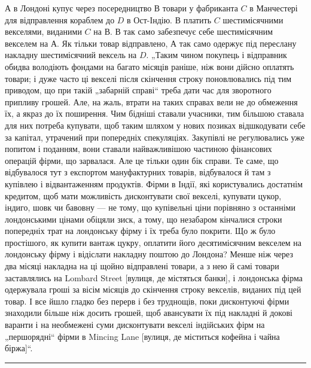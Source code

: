 $А$ в Лондоні купує через посередництво $В$ товари у фабриканта $C$ в Манчестері для відправлення кораблем
до $D$ в Ост-Індію. $В$ платить $C$ шестимісячними векселями, виданими $C$ на $В$. В так само забезпечує себе
шестимісячним
векселем на $А$. Як тільки товар відправлено, $А$ так само одержує під переслану
накладну шестимісячний вексель на $D$. „Таким чином покупець і відправник
обидва володіють фондами на багато місяців раніше, ніж вони дійсно оплатять
товари; і дуже часто ці векселі після скінчення строку поновлювались під тим
приводом, що при такій „забарній справі“ треба дати час для зворотного припливу грошей. Але, на
жаль, втрати на таких справах вели не до обмеження
їх, а якраз до їх поширення. Чим бідніші ставали учасники, тим більшою ставала для них потреба
купувати, щоб таким шляхом у нових позиках відшкодувати
себе за капітал, утрачений при попередніх спекуляціях. Закупівлі не регулювались уже попитом і
поданням, вони ставали найважливішою частиною фінансових
операцій фірми, що зарвалася. Але це тільки один бік справи. Те саме, що відбувалося тут з експортом
мануфактурних товарів, відбувалося й там з купівлею
і відвантаженням продуктів. Фірми в Індії, які користувались достатнім кредитом,
щоб мати можливість дисконтувати свої векселі, купувати цукор, індиго, шовк
чи бавовну — не тому, що купівельні ціни порівняно з останніми лондонськими
цінами обіцяли зиск, а тому, що незабаром кінчалися строки попередніх трат на
лондонську фірму і їх треба було покрити. Що ж було простішого, як купити вантаж цукру, оплатити
його десятимісячним векселем на лондонську фірму і відіслати накладну поштою до Лондона? Менше ніж
через два місяці накладна на
ці щойно відправлені товари, а з нею й самі товари заставлялись на Lombard
Street [вулиця, де містяться банки], і лондонська фірма одержувала гроші за
вісім місяців до скінчення строку векселів, виданих під цей товар. І все йшло
гладко без перерв і без труднощів, поки дисконтуючі фірми знаходили більше
ніж досить грошей, щоб авансувати їх під накладні й докові варанти і на необмежені суми дисконтувати
векселі індійських фірм на „першорядні“ фірми в
Mincing Lane [вулиця, де міститься кофейна і чайна біржа]“.

\pfbreak
